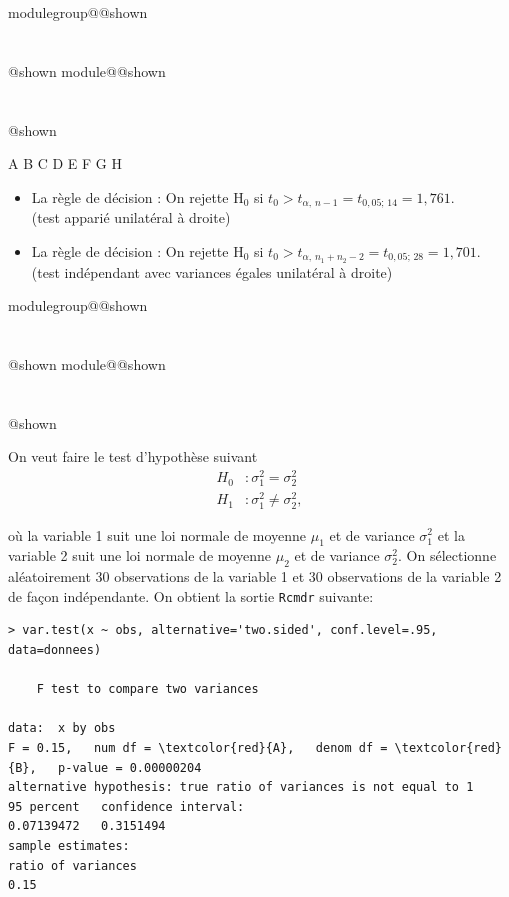 \documentclass{Evaluation}
\makeatletter
\newcommand{\currentmodulekey}{}
\newcommand{\currentmoduletitle}{}
\newcommand{\currentgroupkey}{}
\newcommand{\currentgrouptitle}{}
\newcommand{\showmoduleifneeded}{%
  \ifx\currentgroupkey\empty\else
    \expandafter\ifx\csname modulegroup@\currentgroupkey @shown\endcsname\relax
      \section*{\currentgrouptitle}%
      \expandafter\gdef\csname modulegroup@\currentgroupkey @shown\endcsname{1}%
    \fi
  \fi
  \expandafter\ifx\csname module@\currentmodulekey @shown\endcsname\relax
    \section*{\currentmoduletitle}%
    \expandafter\gdef\csname module@\currentmodulekey @shown\endcsname{1}%
  \fi
}
\newenvironment{A22}{\showmoduleifneeded}{}
\makeatother
\begin{document}
\begin{questions}
\begin{A22}
\begin{parts}
\medskip
\begin{oneparcheckboxes}
    \choice A
    \choice B
    \choice C
    \choice D
    \choice E
    \choice F
    \CorrectChoice G
    \choice H
\end{oneparcheckboxes}\medskip

\end{parts}


\begin{solution}
	\begin{itemize}
		\item La règle de décision : On rejette $\mathrm{H}_0$ si $t_0 > t_{\alpha, \, n-1} = t_{0,05; \, 14} = 1,761$.\\
		(test apparié unilatéral à droite)
		\item La règle de décision : On rejette $\mathrm{H}_0$ si $t_0 > t_{\alpha, \, n_1+n_2-2} = t_{0,05; \, 28} = 1,701$.\\
		(test indépendant avec variances égales unilatéral à droite)
	\end{itemize}
\end{solution}

\end{A22}

\begin{A22}
\question {} %

On veut faire le test d'hypothèse suivant
\begin{align*}
H_0 &:\sigma_1^2 = \sigma_2^2\\
H_1 &:\sigma_1^2 \neq \sigma_2^2,
\end{align*}

où la variable 1 suit une loi normale de moyenne $\mu_1$ et de variance $\sigma_1^2$ et la variable 2 suit une loi normale de moyenne $\mu_2$ et de variance $\sigma_2^2$. On sélectionne aléatoirement 30 observations de la variable 1 et 30 observations de la variable 2 de façon indépendante. On obtient la sortie \texttt{Rcmdr} suivante:

\begin{Verbatim}[commandchars=\\\{\}]
> var.test(x ~ obs, alternative='two.sided', conf.level=.95, data=donnees)

	F test to compare two variances

data:  x by obs
F = 0.15,   num df = \textcolor{red}{A},   denom df = \textcolor{red}{B},   p-value = 0.00000204
alternative hypothesis: true ratio of variances is not equal to 1
95 percent   confidence interval:
0.07139472   0.3151494
sample estimates:
ratio of variances
0.15
\end{Verbatim}


\end{A22}
\end{questions}
\end{document}
